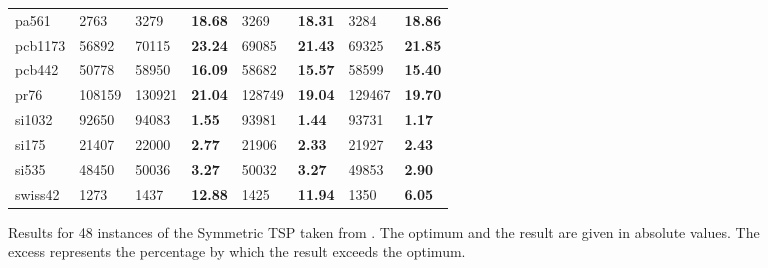 \begin{figure}[!htbp]
\begin{minipage}{\linewidth}
\begin{tabular}{*{3}{L{1.6cm}} >{\bfseries}L{1.6cm} L{1.6cm} >{\bfseries}L{1.6cm} L{1.6cm} >{\bfseries}L{1.6cm}}
			pa561     & 2763   & 3279   & 18.68  & 3269   & 18.31 & 3284   & 18.86  \\
			pcb1173   & 56892  & 70115  & 23.24  & 69085  & 21.43 & 69325  & 21.85  \\
			pcb442    & 50778  & 58950  & 16.09  & 58682  & 15.57 & 58599  & 15.40  \\
			pr76      & 108159 & 130921 & 21.04  & 128749 & 19.04 & 129467 & 19.70  \\
			si1032    & 92650  & 94083  & 1.55   & 93981  & 1.44  & 93731  & 1.17   \\
			si175     & 21407  & 22000  & 2.77   & 21906  & 2.33  & 21927  & 2.43   \\
			si535     & 48450  & 50036  & 3.27   & 50032  & 3.27  & 49853  & 2.90   \\
			swiss42   & 1273   & 1437   & 12.88  & 1425   & 11.94 & 1350   & 6.05   \\
			\bottomrule
		\end{tabular}
	\end{minipage}
	\caption{Results for 48 instances of the Symmetric TSP taken from \cite{REINELT1995}. The optimum and the result are given in absolute values. The excess represents the percentage by which the result exceeds the optimum.}
	\label{fig:STSP}
\end{figure}
